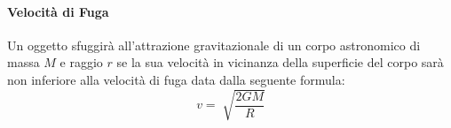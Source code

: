    \paragraph{Velocità di Fuga} Un oggetto sfuggirà all'attrazione 
    gravitazionale di un corpo astronomico di massa $M$ e raggio $r$ se la sua 
    velocità in vicinanza della superficie del corpo sarà non inferiore alla 
    velocità di fuga data dalla seguente formula:
        \begin{equation}
            v = \sqrt[]{\frac{2GM}{R}}
        \end{equation}